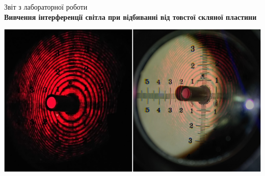 \documentclass[]{article}
\begin{document}
\begin{center}
Звіт з лабораторної роботи \\
\bigskip
{\large\bfseries Вивчення інтерференції світла при відбиванні від товстої скляної пластини}
\end{center}
\begin{center}
\includegraphics[width=0.95\linewidth]{L=61}
\label{fig:L=61}
\end{center}

\pagestyle{empty}

{}\ExpTable




\ExpTable

\ExpTable

\end{document}
